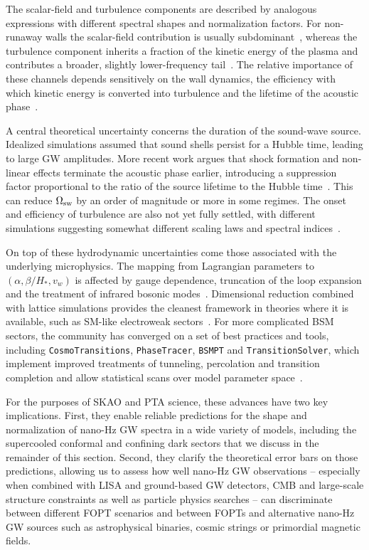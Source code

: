 \documentclass[a4paper,11pt]{article}
\begin{document}
The scalar-field and turbulence components are described by analogous expressions with different spectral 
shapes and normalization factors. For non-runaway walls the scalar-field contribution is usually
subdominant~\citep{Huber:2008hg,Bodeker:2009qy}, whereas the turbulence component 
inherits a fraction of the kinetic energy of the plasma and contributes a broader, slightly lower-frequency
tail~\citep{Caprini:2009dy,Caprini:2019egz}. The relative 
importance of these channels depends sensitively on the wall dynamics, the efficiency with which 
kinetic energy is converted into turbulence and the lifetime of the acoustic
phase~\citep{Ellis:2020awk,Schmitz:2020syl}.

A central theoretical uncertainty concerns the duration of the sound-wave source. Idealized simulations 
assumed that sound shells persist for a Hubble time, leading to large GW amplitudes. More recent work 
argues that shock formation and non-linear effects terminate the acoustic phase earlier, introducing 
a suppression factor proportional to the ratio of the source lifetime to the Hubble 
time~\citep{Ellis:2020awk,Schmitz:2020syl,Hindmarsh:2020hop}. This can reduce $\Omega_{\rm sw}$ 
by an order of magnitude or more in some regimes. The onset and efficiency of turbulence are also 
not yet fully settled, with different simulations suggesting somewhat different scaling laws and spectral
indices~\citep{Caprini:2009dy,Auclair:2022GWPT}.

On top of these hydrodynamic uncertainties come those associated with the underlying microphysics. 
The mapping from Lagrangian parameters to $(\alpha,\beta/H_*,v_w)$ is affected by gauge dependence, 
truncation of the loop expansion and the treatment of infrared bosonic modes~\citep{Patel:2011th,
Garny:2012cg,Ekstedt:2022bff}. Dimensional reduction combined with lattice simulations provides 
the cleanest framework in theories where it is available, such as SM-like electroweak
sectors~\citep{Kajantie:1996mn,Laine:1998qk,Gould:2021oba}. 
For more complicated BSM sectors, the community has converged on a set of best practices 
and tools, including \texttt{CosmoTransitions}, \texttt{PhaseTracer}, \texttt{BSMPT} 
and \texttt{TransitionSolver}, which implement improved treatments of tunneling, 
percolation and transition completion and allow statistical scans over model parameter
space~\citep{Wainwright:2011qy,Athron:2019nbd,Basler:2018cwe,Athron:2022mmm,Ekstedt:2022bff,Athron:2023uxb}.

For the purposes of SKAO and PTA science, these advances have two key implications. First, they 
enable reliable predictions for the shape and normalization of nano-Hz GW spectra in a wide variety 
of models, including the supercooled conformal and confining dark sectors that we discuss 
in the remainder of this section. Second, they clarify the theoretical error bars on those 
predictions, allowing us to assess how well nano-Hz GW observations -- especially when combined 
with LISA and ground-based GW detectors, CMB and large-scale structure constraints as well as 
particle physics searches -- can discriminate between different FOPT scenarios and 
between FOPTs and alternative nano-Hz GW sources such as astrophysical binaries, 
cosmic strings or primordial magnetic fields.
\end{document}
